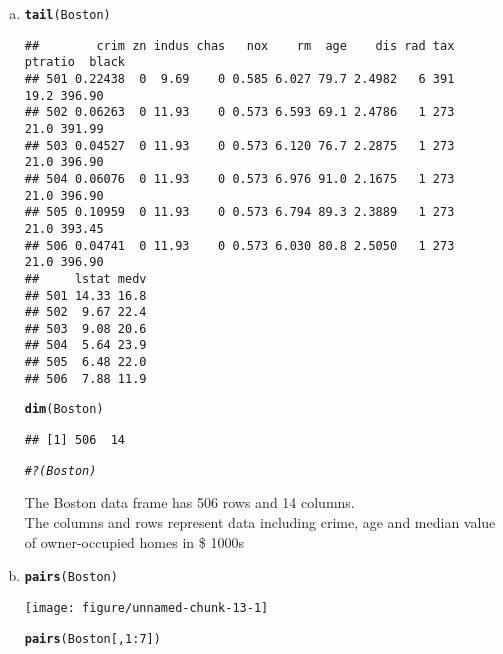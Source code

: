 \documentclass{article}\usepackage[]{graphicx}\usepackage[]{color}
\makeatletter
\def\maxwidth{ %
  \ifdim\Gin@nat@width>\linewidth
    \linewidth
  \else
    \Gin@nat@width
  \fi
}
\newcommand{\hlnum}[1]{\textcolor[rgb]{0.686,0.059,0.569}{#1}}%
\newcommand{\hlcom}[1]{\textcolor[rgb]{0.678,0.584,0.686}{\textit{#1}}}%
\newcommand{\hlopt}[1]{\textcolor[rgb]{0,0,0}{#1}}%
\newcommand{\hlstd}[1]{\textcolor[rgb]{0.345,0.345,0.345}{#1}}%
\newcommand{\hlkwd}[1]{\textcolor[rgb]{0.737,0.353,0.396}{\textbf{#1}}}%
\newenvironment{kframe}{%
 \def\at@end@of@kframe{}%
 \ifinner\ifhmode%
  \def\at@end@of@kframe{\end{minipage}}%
  \begin{minipage}{\columnwidth}%
 \fi\fi%
 \def\FrameCommand##1{\hskip\@totalleftmargin \hskip-\fboxsep
 \colorbox{shadecolor}{##1}\hskip-\fboxsep
     \hskip-\linewidth \hskip-\@totalleftmargin \hskip\columnwidth}%
 \MakeFramed {\advance\hsize-\width
   \@totalleftmargin\z@ \linewidth\hsize
   \@setminipage}}%
 {\par\unskip\endMakeFramed%
 \at@end@of@kframe}
\newenvironment{knitrout}{}{} %
\makeatother
\begin{document}
\begin{enumerate}[(a)]
\item
\begin{knitrout}
\color{fgcolor}\begin{kframe}
\begin{alltt}
\hlkwd{tail}\hlstd{(Boston)}
\end{alltt}
\begin{verbatim}
##        crim zn indus chas   nox    rm  age    dis rad tax ptratio  black
## 501 0.22438  0  9.69    0 0.585 6.027 79.7 2.4982   6 391    19.2 396.90
## 502 0.06263  0 11.93    0 0.573 6.593 69.1 2.4786   1 273    21.0 391.99
## 503 0.04527  0 11.93    0 0.573 6.120 76.7 2.2875   1 273    21.0 396.90
## 504 0.06076  0 11.93    0 0.573 6.976 91.0 2.1675   1 273    21.0 396.90
## 505 0.10959  0 11.93    0 0.573 6.794 89.3 2.3889   1 273    21.0 393.45
## 506 0.04741  0 11.93    0 0.573 6.030 80.8 2.5050   1 273    21.0 396.90
##     lstat medv
## 501 14.33 16.8
## 502  9.67 22.4
## 503  9.08 20.6
## 504  5.64 23.9
## 505  6.48 22.0
## 506  7.88 11.9
\end{verbatim}
\begin{alltt}
\hlkwd{dim}\hlstd{(Boston)}
\end{alltt}
\begin{verbatim}
## [1] 506  14
\end{verbatim}
\begin{alltt}
\hlcom{#?(Boston)}
\end{alltt}
\end{kframe}
\end{knitrout}
The Boston data frame has 506 rows and 14 columns. \\ The columns and rows represent data including crime, age and median value of owner-occupied homes in \$ 1000s \\
\item
\begin{knitrout}
\color{fgcolor}\begin{kframe}
\begin{alltt}
\hlkwd{pairs}\hlstd{(Boston)}
\end{alltt}
\end{kframe}
\texttt{[image: figure/unnamed-chunk-13-1]} 
\begin{kframe}\begin{alltt}
\hlkwd{pairs}\hlstd{(Boston[,}\hlnum{1}\hlopt{:}\hlnum{7}\hlstd{])}
\end{alltt}

\end{kframe}
\end{knitrout}
\end{enumerate}
\end{document}
